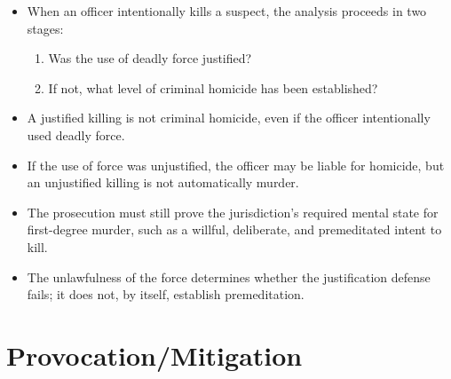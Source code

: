 \documentclass[11pt]{tex/lawoutline}
\begin{document}
\begin{itemize}
    \item When an officer intentionally kills a suspect, the analysis proceeds in two stages:
    \begin{enumerate}
        \item Was the use of deadly force justified?
        \item If not, what level of criminal homicide has been established?
    \end{enumerate}
    \item A justified killing is not criminal homicide, even if the officer intentionally used deadly force.
    \item If the use of force was unjustified, the officer may be liable for homicide, but an unjustified killing is not automatically murder.
    \item The prosecution must still prove the jurisdiction's required mental state for first-degree murder, such as a willful, deliberate, and premeditated intent to kill.
    \item The unlawfulness of the force determines whether the justification defense fails; it does not, by itself, establish premeditation.
\end{itemize}

\section{Provocation/Mitigation}
\end{document}
